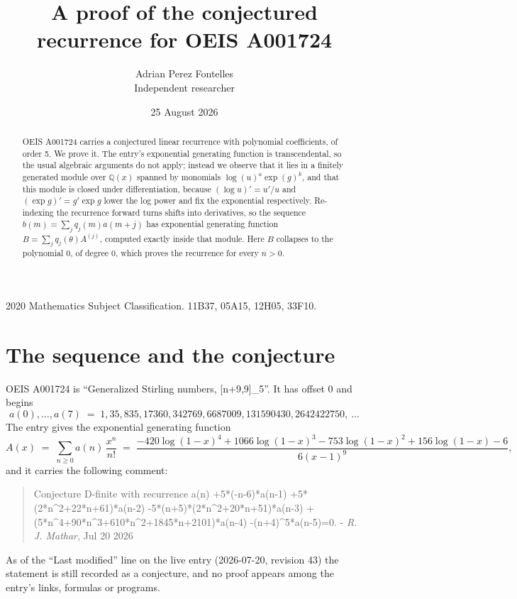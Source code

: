 \documentclass[11pt,a4paper]{article}
\title{A proof of the conjectured recurrence for OEIS A001724}
\author{Adrian Perez Fontelles\\ \small Independent researcher}
\date{25 August 2026}
\theoremstyle{plain}
\theoremstyle{definition}
\begin{document}
\maketitle

\begin{abstract}
OEIS A001724 carries a conjectured linear recurrence with polynomial coefficients, of
order 5. We prove it. The entry's exponential generating function is
transcendental, so the usual algebraic arguments do not apply; instead we observe that it
lies in a finitely generated module over $\mathbb{Q}(x)$ spanned by monomials
$\log(u)^{a}\exp(g)^{k}$, and that this module is closed under differentiation, because
$(\log u)'=u'/u$ and $(\exp g)'=g'\exp g$ lower the log power and fix the exponential
respectively. Re-indexing the recurrence forward turns shifts into derivatives, so the
sequence $b(m)=\sum_{j}q_{j}(m)a(m+j)$ has exponential generating function
$B=\sum_{j}q_{j}(\theta)A^{(j)}$, computed exactly inside that module. Here $B$ collapses
to the polynomial $0$, of degree $0$, which proves the recurrence for every
$n>0$.
\end{abstract}

\noindent\small 2020 Mathematics Subject Classification. 11B37, 05A15, 12H05, 33F10.\normalsize

\section{The sequence and the conjecture}

OEIS A001724 is ``Generalized Stirling numbers, [n+9,9]\_5''. It has offset $0$ and begins
\[
a(0),\dots,a(7)\;=\;1, 35, 835, 17360, 342769, 6687009, 131590430, 2642422750,\ \dots
\]
The entry gives the exponential generating function
\begin{equation}\label{eq:gf}
A(x)\;=\;\sum_{n\ge 0} a(n)\,\frac{x^{n}}{n!}\;=\;\frac{- 420 \log{\left(1 - x \right)}^{4} + 1066 \log{\left(1 - x \right)}^{3} - 753 \log{\left(1 - x \right)}^{2} + 156 \log{\left(1 - x \right)} - 6}{6 \left(x - 1\right)^{9}} ,
\end{equation}
and it carries the following comment:
\begin{quote}\small
Conjecture D-finite with recurrence a(n) +5*(-n-6)*a(n-1) +5*(2*n\textasciicircum{}2+22*n+61)*a(n-2) -5*(n+5)*(2*n\textasciicircum{}2+20*n+51)*a(n-3) +(5*n\textasciicircum{}4+90*n\textasciicircum{}3+610*n\textasciicircum{}2+1845*n+2101)*a(n-4) -(n+4)\textasciicircum{}5*a(n-5)=0. - \emph{R. J. Mathar}, Jul 20 2026
\end{quote}
As of the ``Last modified'' line on the live entry (2026-07-20, revision 43) the
statement is still recorded as a conjecture, and no proof appears among the entry's links,
formulas or programs.
\end{document}
